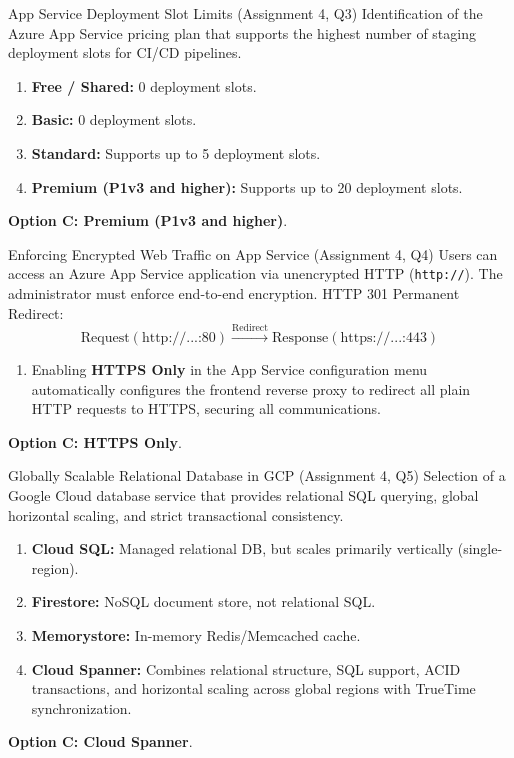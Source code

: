\begin{solved}{App Service Deployment Slot Limits (Assignment 4, Q3)}
\Given Identification of the Azure App Service pricing plan that supports the highest number of staging deployment slots for CI/CD pipelines.
\Steps
\begin{enumerate}[leftmargin=*]
  \item \textbf{Free / Shared:} 0 deployment slots.
  \item \textbf{Basic:} 0 deployment slots.
  \item \textbf{Standard:} Supports up to 5 deployment slots.
  \item \textbf{Premium (P1v3 and higher):} Supports up to 20 deployment slots.
\end{enumerate}
\Answer \textbf{Option C: Premium (P1v3 and higher)}.
\end{solved}

\begin{solved}{Enforcing Encrypted Web Traffic on App Service (Assignment 4, Q4)}
\Given Users can access an Azure App Service application via unencrypted HTTP (\texttt{http://}). The administrator must enforce end-to-end encryption.
\Formula HTTP 301 Permanent Redirect:
\begin{equation}
\text{Request}(\text{http://...:80}) \xrightarrow{\text{Redirect}} \text{Response}(\text{https://...:443})
\end{equation}
\Steps
\begin{enumerate}[leftmargin=*]
  \item Enabling \textbf{HTTPS Only} in the App Service configuration menu automatically configures the frontend reverse proxy to redirect all plain HTTP requests to HTTPS, securing all communications.
\end{enumerate}
\Answer \textbf{Option C: HTTPS Only}.
\end{solved}

\begin{solved}{Globally Scalable Relational Database in GCP (Assignment 4, Q5)}
\Given Selection of a Google Cloud database service that provides relational SQL querying, global horizontal scaling, and strict transactional consistency.
\Steps
\begin{enumerate}[leftmargin=*]
  \item \textbf{Cloud SQL:} Managed relational DB, but scales primarily vertically (single-region).
  \item \textbf{Firestore:} NoSQL document store, not relational SQL.
  \item \textbf{Memorystore:} In-memory Redis/Memcached cache.
  \item \textbf{Cloud Spanner:} Combines relational structure, SQL support, ACID transactions, and horizontal scaling across global regions with TrueTime synchronization.
\end{enumerate}
\Answer \textbf{Option C: Cloud Spanner}.
\end{solved}

